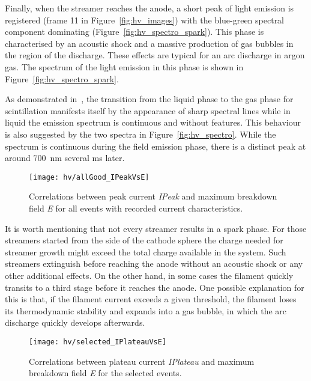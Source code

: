 Finally, when the streamer reaches the anode, a short peak of light emission is registered (frame \num{11} in Figure~\ref{fig:hv_images}) with the blue-green spectral component dominating (Figure~\ref{fig:hv_spectro_spark}).
This phase is characterised by an acoustic shock and a massive production of gas bubbles in the region of the discharge.
These effects are typical for an arc discharge in argon gas.
The spectrum of the light emission in this phase  is shown in Figure~\ref{fig:hv_spectro_spark}. 

As demonstrated in~\cite{Heindl}, the transition from the liquid phase to the gas phase for scintillation manifests itself by the appearance of sharp spectral lines while in liquid the emission spectrum is continuous and without features.
This behaviour is also suggested by the two spectra in Figure~\ref{fig:hv_spectro}.
While the spectrum is continuous during the field emission phase, there is a distinct peak at around \SI{700}{\nano\metre} several \si{\milli\second} later.

\begin{figure}[tbp]
	\centering
	\texttt{[image: hv/allGood\_IPeakVsE]}
	\caption[ study peak current versus maximum breakdown field]{%
		Correlations between peak current \emph{IPeak} and maximum breakdown field \emph{E} for all events with recorded current characteristics.
	}
	\label{fig:hv_IPeakVsE}
\end{figure}

It is worth mentioning that not every streamer results in a spark phase.
For those streamers started from the side of the cathode sphere the charge needed for streamer growth might exceed the total charge available in the system.
Such streamers extinguish before reaching the anode without an acoustic shock or any other additional effects.
On the other hand, in some cases the filament quickly transits to a third stage before it reaches the anode.
One possible explanation for this is that, if the filament current exceeds a given threshold, the filament loses its thermodynamic stability and expands into a gas bubble, in which the arc discharge quickly develops afterwards.

\begin{figure}[tbp]
	\centering
	\texttt{[image: hv/selected\_IPlateauVsE]}
	\caption[ study plateau current versus maximum breakdown field]{%
		Correlations between plateau current \emph{IPlateau} and maximum breakdown field \emph{E} for the selected events.
	}
	\label{fig:hv_IPlateauVsE}
\end{figure}

